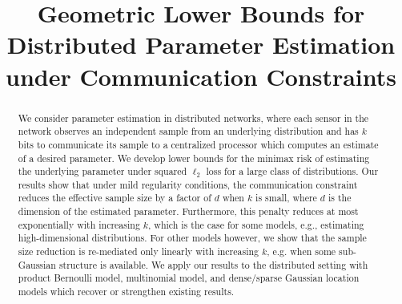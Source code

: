\documentclass[final,12pt]{colt2018} %
\title[Distributed Parameter Estimation]{Geometric Lower Bounds for Distributed Parameter Estimation under Communication Constraints}
\begin{document}
%


%
\maketitle


\begin{abstract}
We consider parameter estimation in distributed networks,
where each sensor in the network observes an independent
sample from an underlying distribution and has $k$ bits to
communicate its sample to a centralized processor which computes an estimate of a desired parameter. 
We develop lower bounds for the minimax risk of estimating the
underlying parameter under squared $\ell_2$ loss for a large class of distributions.
Our results show that under mild regularity conditions, the communication constraint reduces the effective sample size by a factor of $d$ when $k$ is small, where $d$ is the dimension of the estimated parameter. Furthermore, this penalty reduces at most exponentially with increasing $k$, which is the case for some models, e.g., estimating high-dimensional distributions. For other models however, we show that the sample size reduction is re-mediated only linearly with increasing $k$, e.g. when some sub-Gaussian structure is available. We apply our results to the distributed setting with product Bernoulli model, multinomial model, and dense/sparse Gaussian location models which recover or strengthen existing results.


\end{abstract}
\end{document}
